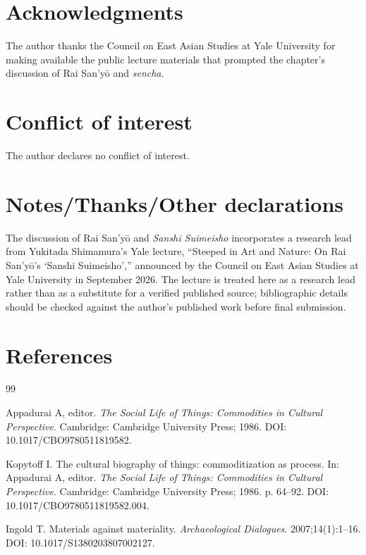 \documentclass[numbers]{IntechOpen-Book}
\begin{document}
\begin{backmatter}

\section*{Acknowledgments}
The author thanks the Council on East Asian Studies at Yale University for making available the public lecture materials that prompted the chapter's discussion of Rai San'yō and \textit{sencha}.

\section*{Conflict of interest}
The author declares no conflict of interest.

\section*{Notes/Thanks/Other declarations}
The discussion of Rai San'yō and \textit{Sanshi Suimeisho} incorporates a research lead from Yukitada Shimamura's Yale lecture, ``Steeped in Art and Nature: On Rai San'yō's `Sanshi Suimeisho','' announced by the Council on East Asian Studies at Yale University in September 2026. The lecture is treated here as a research lead rather than as a substitute for a verified published source; bibliographic details should be checked against the author's published work before final submission.

\section*{References}

\begin{thebibliography}{99}

Appadurai A, editor. \textit{The Social Life of Things: Commodities in Cultural Perspective}. Cambridge: Cambridge University Press; 1986. DOI: 10.1017/CBO9780511819582.

Kopytoff I. The cultural biography of things: commoditization as process. In: Appadurai A, editor. \textit{The Social Life of Things: Commodities in Cultural Perspective}. Cambridge: Cambridge University Press; 1986. p. 64--92. DOI: 10.1017/CBO9780511819582.004.

Ingold T. Materials against materiality. \textit{Archaeological Dialogues}. 2007;14(1):1--16. DOI: 10.1017/S1380203807002127.


\end{thebibliography}
\end{backmatter}
\end{document}
